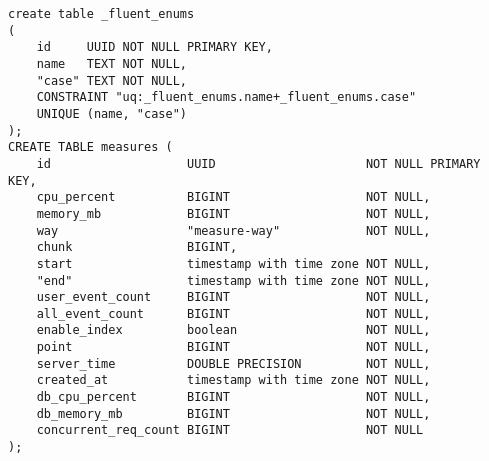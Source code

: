 \documentclass[../../../../main]{subfiles}
\begin{document}
    \begin{mdframed}
        \begin{verbatim}
create table _fluent_enums
(
    id     UUID NOT NULL PRIMARY KEY,
    name   TEXT NOT NULL,
    "case" TEXT NOT NULL,
    CONSTRAINT "uq:_fluent_enums.name+_fluent_enums.case"
    UNIQUE (name, "case")
);
CREATE TABLE measures (
    id                   UUID                     NOT NULL PRIMARY KEY,
    cpu_percent          BIGINT                   NOT NULL,
    memory_mb            BIGINT                   NOT NULL,
    way                  "measure-way"            NOT NULL,
    chunk                BIGINT,
    start                timestamp with time zone NOT NULL,
    "end"                timestamp with time zone NOT NULL,
    user_event_count     BIGINT                   NOT NULL,
    all_event_count      BIGINT                   NOT NULL,
    enable_index         boolean                  NOT NULL,
    point                BIGINT                   NOT NULL,
    server_time          DOUBLE PRECISION         NOT NULL,
    created_at           timestamp with time zone NOT NULL,
    db_cpu_percent       BIGINT                   NOT NULL,
    db_memory_mb         BIGINT                   NOT NULL,
    concurrent_req_count BIGINT                   NOT NULL
);
        \end{verbatim}
    \end{mdframed}
    \label{fig:measures-table-definication}
\end{document}
